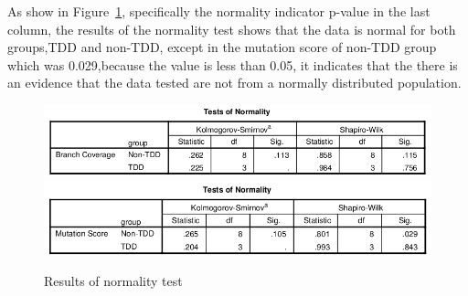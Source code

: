 \documentclass[conference]{IEEEtran}
\begin{document}
As show in Figure~\ref{table:Results of normality test}, specifically the normality indicator p-value in the last column, the results of the normality test shows that the data is normal for both groups,TDD and non-TDD, except in the mutation score of non-TDD group which was 0.029,because the value is less than 0.05, it indicates that the there is an evidence that the data tested are not from a normally distributed population. %
\begin{figure}[t!]
\centering
\includegraphics[scale=.32]{test_of_normality_Branch.png}
\includegraphics[scale=.33]{test_of_normality_mutation.png}
\caption{Results of normality test}
\label{table:Results of normality test}
\end{figure}
\end{document}
